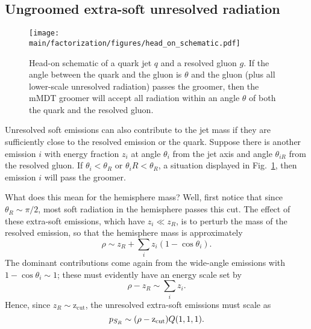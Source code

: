 \documentclass[12pt,twoside,class=../reedthesis, crop=false]{standalone}
\providecommand{\zcut}{\mathrm{z_{cut}}}
\begin{document}
\subsection{Ungroomed extra-soft unresolved radiation}
	\begin{figure}
	\begin{centering}
		\texttt{[image: \\main/factorization/figures/head\_on\_schematic.pdf]}
		\caption{\label{fig:head-on schematic}Head-on schematic of a quark jet $q$ and a resolved gluon $g$. If the angle between the quark and the gluon is $\theta$ and the gluon (plus all lower-scale unresolved radiation) passes the groomer, then the mMDT groomer will accept all radiation within an angle $\theta$ of both the quark and the resolved gluon.}
	\end{centering}
	\end{figure}
	Unresolved soft emissions can also contribute to the jet mass if they are sufficiently close to the resolved emission or the quark. Suppose there is another emission $i$ with energy fraction $z_i$ at angle $\theta_i$ from the jet axis and angle $\theta_{iR}$ from the resolved gluon. If $\theta_i < \theta_R$ or $\theta_iR < \theta_R$, a situation displayed in Fig.~\ref{fig:head-on schematic}, then emission $i$ will pass the groomer.

	What does this mean for the hemisphere mass? Well, first notice that since $\theta_R \sim \pi/2$, most soft radiation in the hemisphere passes this cut. The effect of these extra-soft emissions, which have $z_i \ll z_R$, is to perturb the mass of the resolved emission, so that the hemisphere mass is approximately
	\begin{equation}
		\rho \sim z_R + \sum_i z_i(1 - \cos\theta_i).
	\end{equation}
	The dominant contributions come again from the wide-angle emissions with $1 - \cos\theta_i \sim 1$; these must evidently have an energy scale set by
	\begin{equation}
		\rho - z_R \sim \sum_i z_i.
	\end{equation}
	Hence, since $z_R \sim \zcut$, the unresolved extra-soft emissions must scale as
	\begin{equation}
		p_{S_R} \sim \qty(\rho - \zcut)Q(1, 1, 1).
	\end{equation}
\end{document}
